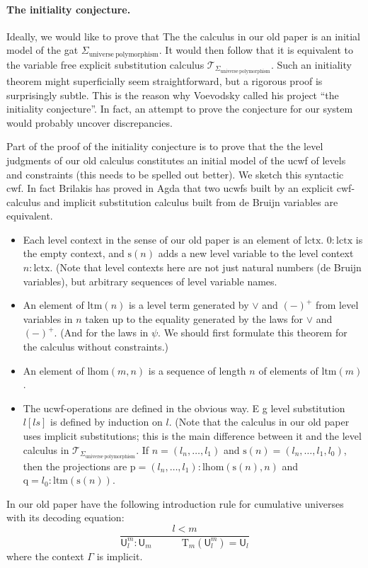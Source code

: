 \documentclass[11pt,a4paper]{article}
\theoremstyle{definition}
\newcommand{\UU}{\mathsf{U}}
\def\lhom{\mathrm{lhom}}
\def\UU{\mathsf{U}}
\newcommand{\T}{\mathsf{T}}
\def\lctx{\mathrm{lctx}}
\def\ltm{\mathrm{ltm}}
\def\s{\mathrm{s}}
\def\p{\mathrm{p}}
\def\q{\mathrm{q}}
\def\T{\mathcal{T}}
\newcommand{\Ta}{\mathrm{T}}
\begin{document}
\paragraph{The initiality conjecture.} Ideally, we would like to prove that The the calculus in our old paper is an initial model of the gat  $\Sigma_{\mathrm{universe\ polymorphism}}$. It would then follow that it is equivalent to the variable free explicit substitution calculus $\T_{\Sigma_{\mathrm{universe\ polymorphism}}}$.
Such an initiality theorem might superficially seem straightforward, but a rigorous proof is surprisingly subtle. This is the reason why Voevodsky called his project ``the initiality conjecture''. In fact, an attempt to prove the conjecture for our system would probably uncover discrepancies.

Part of the proof of the initiality conjecture is to prove that the the level judgments of our old calculus constitutes an initial model of the ucwf of levels and constraints (this needs to be spelled out better). We sketch this syntactic cwf. In fact Brilakis has proved in Agda that two ucwfs built by an explicit cwf-calculus and implicit substitution calculus built from de Bruijn variables are equivalent. 
\begin{itemize}
\item Each level context in the sense of our old paper is an element of $\lctx$. $0 : \lctx$ is the empty context, and $\s(n)$ adds a new level variable to the level context $n : \lctx$. (Note that level contexts here are not just natural numbers (de Bruijn variables), but arbitrary sequences of level variable names.
\item An element of $\ltm(n)$ is a level term generated by $\vee$ and $(-)^+$ from level variables in $n$ taken up to the equality generated by the laws for
$\vee$ and $(-)^+$. (And for the laws in $\psi$. We should first formulate this theorem for the calculus without constraints.)
 \item An element of $\lhom(m,n)$ is a sequence of length $n$ of elements of $\ltm(m)$.
 \item The ucwf-operations are defined in the obvious way. E g level substitution $l[ls]$ is defined by induction on $l$. (Note that the calculus in our old paper uses implicit substitutions; this is the main difference between it and the level calculus in $\T_{\Sigma_{\mathrm{universe\ polymorphism}}}$. If $n = (l_n, \ldots, l_1)$ and $\s(n) =  (l_n, \ldots, l_1, l_0)$, then the projections are  $\p = (l_n, \ldots, l_1) : \lhom(\s(n),n)$ and $\q = l_0 : \ltm(\s(n))$.
\end{itemize}
In our old paper have the following introduction rule for cumulative universes with its decoding equation:
$$
\frac{l < m}
{\UU^m_l : \UU_m\hspace{3em}\Ta_m(\UU^m_l) = \UU_l}
$$
where the context $\Gamma$ is implicit.
\end{document}
